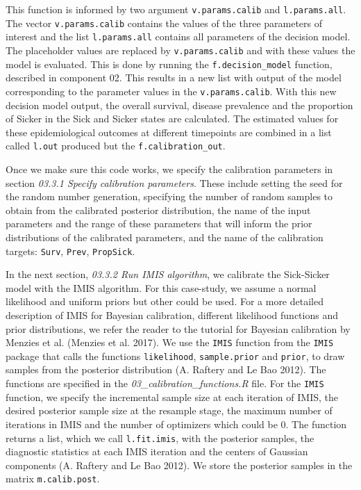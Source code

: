\documentclass[]{article}
\begin{document}
This function is informed by two argument \texttt{v.params.calib} and
\texttt{l.params.all}. The vector \texttt{v.params.calib} contains the
values of the three parameters of interest and the list
\texttt{l.params.all} contains all parameters of the decision model. The
placeholder values are replaced by \texttt{v.params.calib} and with
these values the model is evaluated. This is done by running the
\texttt{f.decision\_model} function, described in component 02. This
results in a new list with output of the model corresponding to the
parameter values in the \texttt{v.params.calib}. With this new decision
model output, the overall survival, disease prevalence and the
proportion of Sicker in the Sick and Sicker states are calculated. The
estimated values for these epidemiological outcomes at different
timepoints are combined in a list called \texttt{l.out} produced but the
\texttt{f.calibration\_out}.

Once we make sure this code works, we specify the calibration parameters
in section \emph{03.3.1 Specify calibration parameters}. These include
setting the seed for the random number generation, specifying the number
of random samples to obtain from the calibrated posterior distribution,
the name of the input parameters and the range of these parameters that
will inform the prior distributions of the calibrated parameters, and
the name of the calibration targets: \texttt{Surv}, \texttt{Prev},
\texttt{PropSick}.

In the next section, \emph{03.3.2 Run IMIS algorithm}, we calibrate the
Sick-Sicker model with the IMIS algorithm. For this case-study, we
assume a normal likelihood and uniform priors but other could be used.
For a more detailed description of IMIS for Bayesian calibration,
different likelihood functions and prior distributions, we refer the
reader to the tutorial for Bayesian calibration by Menzies et al.
(Menzies et al. 2017). We use the \texttt{IMIS} function from the
\texttt{IMIS} package that calls the functions \texttt{likelihood},
\texttt{sample.prior} and \texttt{prior}, to draw samples from the
posterior distribution (A. Raftery and Le Bao 2012). The functions are
specified in the \emph{03\_calibration\_functions.R} file. For the
\texttt{IMIS} function, we specify the incremental sample size at each
iteration of IMIS, the desired posterior sample size at the resample
stage, the maximum number of iterations in IMIS and the number of
optimizers which could be 0. The function returns a list, which we call
\texttt{l.fit.imis}, with the posterior samples, the diagnostic
statistics at each IMIS iteration and the centers of Gaussian components
(A. Raftery and Le Bao 2012). We store the posterior samples in the
matrix \texttt{m.calib.post}.
\end{document}
